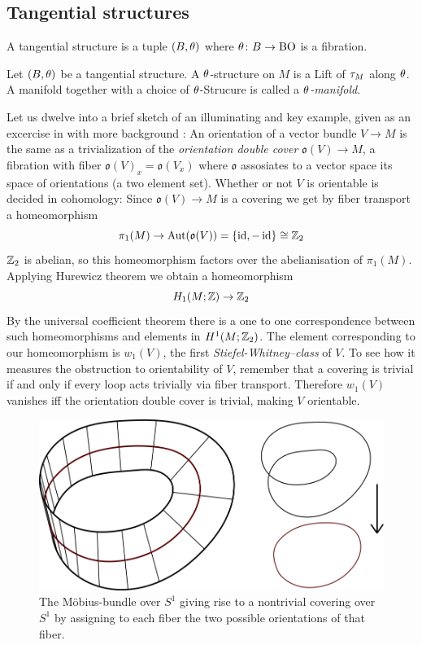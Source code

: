 \subsection{Tangential structures}
\begin{defi}
    A tangential structure is a tuple $(B,\theta)$ where $\theta\colon B\to\mathrm{BO}$ is a fibration.
\end{defi}
\begin{defi}[$\t$-manifold]
    Let $(B,\theta)$ be a tangential structure. A $\t$-structure on $M$ is a Lift of $\tau_M$ along $\t$. A manifold together with a choice of $\t$-Strucure is called a \emph{$\t$-manifold}.
\end{defi}
Let us dwelve into a brief sketch of an illuminating and key example, given as an excercise in \cite{freed:lec} with more background :
An orientation of a vector bundle $V\to M$ is the same as a trivialization of the \emph{orientation double cover} $\mathfrak{o}(V) \to M$, a fibration with fiber $\mathfrak{o}(V)_x = \mathfrak{o}(V_x)$ where $\mathfrak{o}$ assosiates to a vector space its space of orientations (a two element set).
Whether or not $V$ is orientable is decided in cohomology: Since $\mathfrak{o}(V) \to M$ is a covering we get by fiber transport a homeomorphism
\begin{equation*}
    \pi_1(M) \to \operatorname{Aut}(\mathfrak{o}(V)) = \{\operatorname{id}, -\operatorname{id}\} \cong \mathbb{Z}_2
\end{equation*}
 $\mathbb{Z}_2$ is abelian, so this homeomorphism factors over the abelianisation of $\pi_1(M)$. Applying Hurewicz theorem we obtain a homeomorphism
\begin{equation*}
    H_1(M;\mathbb{Z}) \to \mathbb{Z}_2
\end{equation*}
By the universal coefficient theorem there is a one to one correspondence between such homeomorphisms and elements in $H^1(M;\mathbb{Z}_2)$.
The element corresponding to our homeomorphism is $w_1(V)$, the first \emph{Stiefel-Whitney--class} of $V$.
To see how it measures the obstruction to orientability of $V$, remember that a covering is trivial if and only if every loop acts trivially via fiber transport. 
Therefore $w_1(V)$ vanishes iff the orientation double cover is trivial, making $V$ orientable.\\
\begin{figure}
    \centering
    \includegraphics[width=.8\textwidth]{img/moebius.png}
    \caption{The Möbius-bundle over $S^1$ giving rise to a nontrivial covering over $S^1$ by assigning to each fiber the two possible orientations of that fiber.}\label{fig:moeb}
\end{figure}
